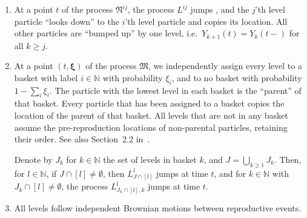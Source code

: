 \documentclass[reqno,draft]{amsart}
\numberwithin{equation}{section}
\theoremstyle{plain}
\theoremstyle{remark}
\newcommand{\N}{\mathbb{N}} %
\begin{document}
\begin{enumerate}
    \item At a point $t$ of the process $\mathfrak{N}^{ij}$, the process $L^{ij}$ jumps , and the $j$'th level particle ``looks down'' to the $i$'th level particle and copies its location. All other particles are ``bumped up'' by one level, i.e.\ $Y_{k+1}(t) = Y_k(t-)$ for all $k \ge j$.
    \item At a point $(t,\boldsymbol \xi)$ of the process $\mathfrak{M}$, we independently assign every level to a basket with label $i\in \N$ with probability $\xi_i$, and to no basket with probability $1 - \sum_i \xi_i$. The particle with the lowest level in each basket is the ``parent'' of that basket.
    Every particle that has been assigned to a basket copies the location of the parent of that basket. All levels that are not in any basket assume the pre-reproduction locations of non-parental particles, retaining their order. See also Section~2.2 in~\cite{xiflemingviot}.

        Denote by $J_k$ for $k\in \N$ the set of levels in basket $k$, and $J = \bigcup_{k\ge 1} J_k$. Then, for $l\in \N$, if $J \cap [l] \neq \emptyset$, then $L^l_{J \cap [l]}$ jumps at time $t$, and for $k\in \N$ with $J_k \cap [l] \neq \emptyset$, the process $L^l_{J_k\cap [l], k}$ jumps at time $t$.
    \item All levels follow independent Brownian motions between reproductive events.
\end{enumerate}
%
\end{document}
